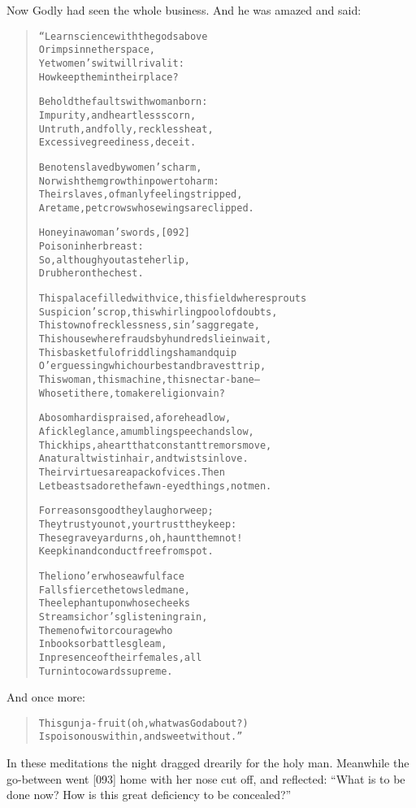 \documentclass[article, twoside, 14pt]{memoir}
\renewenvironment{verbatim}{%
\begin{quote}%
\vskip -10pt%
\begin{alltt}\normalfont\large}{\end{alltt}%
\end{quote}%
\vskip -10pt
} %
\begin{document}
Now Godly had seen the whole business. And he was amazed and said:

\begin{verbatim}
“Learn science with the gods above
    Or imps in nether space,
Yet women's wit will rival it:
    How keep them in their place?

Behold the faults with woman born:
Impurity, and heartless scorn,
Untruth, and folly, reckless heat,
Excessive greediness, deceit.

Be not enslaved by women's charm,
Nor wish them growth in power to harm:
Their slaves, of manly feeling stripped,
Are tame, pet crows whose wings are clipped.

Honey in a woman's words,                               [092]
    Poison in her breast:
So, although you taste her lip,
    Drub her on the chest.

This palace filled with vice, this field where sprouts
Suspicion's crop, this whirling pool of doubts,
This town of recklessness, sin's aggregate,
This house where frauds by hundreds lie in wait,
This basketful of riddling sham and quip
O'er guessing which our best and bravest trip,
This woman, this machine, this nectar-bane--
Who set it here, to make religion vain?

A bosom hard is praised, a forehead low,
A fickle glance, a mumbling speech and slow,
Thick hips, a heart that constant tremors move,
A natural twist in hair, and twists in love.
Their virtues are a pack of vices. Then
Let beasts adore the fawn-eyed things, not men.

For reasons good they laugh or weep;
They trust you not, your trust they keep:
These graveyard urns, oh, haunt them not!
Keep kin and conduct free from spot.

The lion o'er whose awful face
    Falls fierce the towsled mane,
The elephant upon whose cheeks
    Streams ichor's glistening rain,
The men of wit or courage who
    In books or battles gleam,
In presence of their females, all
    Turn into cowards supreme.
\end{verbatim}
And once more:

\begin{verbatim}
This gunja-fruit (oh, what was God about?)
Is poisonous within, and sweet without.”
\end{verbatim}
In these meditations the night dragged drearily for the holy man.
Meanwhile the go-between went [093] home with her nose cut off, and
reflected:
``What is to be done now? How is this great deficiency to be concealed?''
\end{document}
